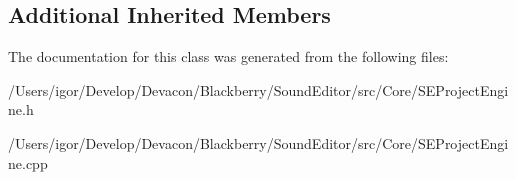 \subsection*{Additional Inherited Members}


The documentation for this class was generated from the following files\+:\begin{DoxyCompactItemize}
\item 
/\+Users/igor/\+Develop/\+Devacon/\+Blackberry/\+Sound\+Editor/src/\+Core/S\+E\+Project\+Engine.\+h\item 
/\+Users/igor/\+Develop/\+Devacon/\+Blackberry/\+Sound\+Editor/src/\+Core/S\+E\+Project\+Engine.\+cpp\end{DoxyCompactItemize}
